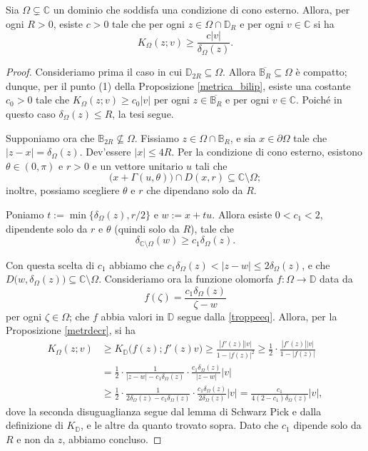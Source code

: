 \begin{lm} \label{cones}
    Sia $\Omega\subsetneq\mathbb{C}$ un dominio che soddisfa una condizione di cono esterno. Allora, per ogni $R>0$, esiste $c>0$ tale che per ogni $z\in\Omega\cap\mathbb{D}_R$ e per ogni $v\in\mathbb{C}$ si ha
    $$K_\Omega(z;v) \ge \frac{c|v|}{\delta_\Omega(z)}.$$
\end{lm}

\begin{proof}
    Consideriamo prima il caso in cui $\mathbb{D}_{2R}\subseteq\Omega$. Allora $\overline{\mathbb{B}_R}\subseteq\Omega$ è compatto; dunque, per il punto (1) della Proposizione \ref{metrica_bilip}, esiste una costante $c_0>0$ tale che $K_\Omega(z;v)\ge c_0|v|$ per ogni $z\in \overline{\mathbb{B}_R}$ e per ogni $v\in\mathbb{C}$. Poiché in questo caso $\delta_\Omega(z)\le R$, la tesi segue.

    Supponiamo ora che $\mathbb{B}_{2R}\not\subseteq\Omega$. Fissiamo $z\in\Omega\cap\mathbb{B}_R$, e sia $x\in\partial\Omega$ tale che $|z-x|=\delta_\Omega(z)$. Dev'essere $|x|\le 4R$. Per la condizione di cono esterno, esistono $\theta\in(0,\pi)$ e $r>0$ e un vettore unitario $u$ tali che
    $$\big(x+\Gamma(u,\theta)\big)\cap D(x,r) \subseteq\mathbb{C}\setminus\Omega;$$
    inoltre, possiamo scegliere $\theta$ e $r$ che dipendano solo da $R$.

    Poniamo $t:=\min\{\delta_\Omega(z),r/2\}$ e $w:=x+tu$. Allora esiste $0<c_1<2$, dipendente solo da $r$ e $\theta$ (quindi solo da $R$), tale che
    \begin{equation}\label{troppeeq}
        \delta_{\mathbb{C}\setminus\Omega}(w)\ge c_1\delta_\Omega(z).
    \end{equation}

    Con questa scelta di $c_1$ abbiamo che $c_1\delta_\Omega(z)<|z-w|\le 2\delta_\Omega(z)$, e che ${D\big(w,\delta_\Omega(z)\big)\subseteq\mathbb{C}\setminus\Omega}$. Consideriamo ora la funzione olomorfa $f:\Omega\longrightarrow\mathbb{D}$ data da
    $$f(\zeta)=\frac{c_1\delta_\Omega(z)}{\zeta-w}$$
    per ogni $\zeta\in\Omega$; che $f$ abbia valori in $\mathbb{D}$ segue dalla \eqref{troppeeq}. Allora, per la Proposizione \ref{metrdecr}, si ha
    \begin{align*}
        K_\Omega(z;v) &\ge K_{\mathbb{D}}\big(f(z);f'(z)v\big)\ge \frac{|f'(z)||v|}{1-|f(z)|^2} \ge \frac{1}{2}\cdot\frac{|f'(z)||v|}{1-|f(z)|}\\
        &=\frac{1}{2}\cdot\frac{1}{|z-w|-c_1\delta_\Omega(z)}\cdot\frac{c_1\delta_\Omega(z)}{|z-w|}|v|\\
        &\ge \frac{1}{2}\cdot\frac{1}{2\delta_\Omega(z)-c_1\delta_\Omega(z)}\cdot\frac{c_1\delta_\Omega(z)}{2\delta_\Omega(z)}|v|=\frac{c_1}{4(2-c_1)\delta_\Omega(z)}|v|,
    \end{align*}
    dove la seconda disuguaglianza segue dal lemma di Schwarz Pick e dalla definizione di $K_\mathbb{D}$, e le altre da quanto trovato sopra. Dato che $c_1$ dipende solo da $R$ e non da $z$, abbiamo concluso.
\end{proof}

